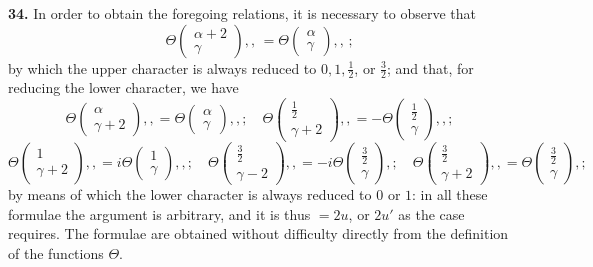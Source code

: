 \documentclass[11pt]{article}
\begin{document}
\textbf{34.} In order to obtain the foregoing relations, it is necessary to observe that
\[
\Theta\!\begin{pmatrix} \alpha + 2 \\ \gamma \end{pmatrix},,\, = \Theta\!\begin{pmatrix} \alpha \\ \gamma \end{pmatrix},,\,;
\]
by which the upper character is always reduced to $0, 1, \tfrac{1}{2}$, or $\tfrac{3}{2}$; and that, for reducing the lower character, we have
\[
\Theta\!\begin{pmatrix} \alpha \\ \gamma + 2 \end{pmatrix},, = \Theta\!\begin{pmatrix} \alpha \\ \gamma \end{pmatrix},,;\quad \Theta\!\begin{pmatrix} \tfrac{1}{2} \\ \gamma + 2 \end{pmatrix},, = -\Theta\!\begin{pmatrix} \tfrac{1}{2} \\ \gamma \end{pmatrix},,;
\]
\[
\Theta\!\begin{pmatrix} 1 \\ \gamma + 2 \end{pmatrix},, = i\Theta\!\begin{pmatrix} 1 \\ \gamma \end{pmatrix},,;\quad \Theta\!\begin{pmatrix} \tfrac{3}{2} \\ \gamma - 2 \end{pmatrix},, = -i\Theta\!\begin{pmatrix} \tfrac{3}{2} \\ \gamma \end{pmatrix},;\quad \Theta\!\begin{pmatrix} \tfrac{3}{2} \\ \gamma + 2 \end{pmatrix},, = \Theta\!\begin{pmatrix} \tfrac{3}{2} \\ \gamma \end{pmatrix},;
\]
by means of which the lower character is always reduced to $0$ or $1$: in all these formulae the argument is arbitrary, and it is thus $= 2u$, or $2u'$ as the case requires. The formulae are obtained without difficulty directly from the definition of the functions $\Theta$.
\end{document}
